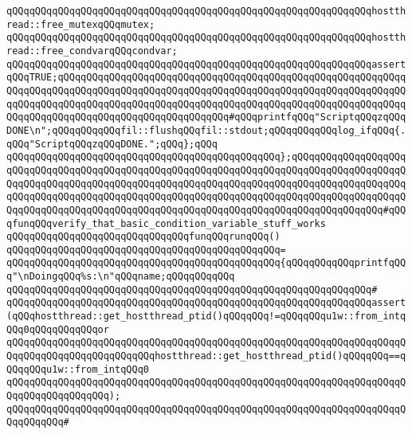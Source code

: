 \newline
\verb|qQQqqQQqqQQqqQQqqQQqqQQqqQQqqQQqqQQqqQQqqQQqqQQqqQQqqQQqqQQqqQQqhostthread::free_mutexqQQqmutex;|\newline
\verb|qQQqqQQqqQQqqQQqqQQqqQQqqQQqqQQqqQQqqQQqqQQqqQQqqQQqqQQqqQQqqQQqhostthread::free_condvarqQQqcondvar;|\newline
\newline
\verb|qQQqqQQqqQQqqQQqqQQqqQQqqQQqqQQqqQQqqQQqqQQqqQQqqQQqqQQqqQQqqQQqassertqQQqTRUE;qQQqqQQqqQQqqQQqqQQqqQQqqQQqqQQqqQQqqQQqqQQqqQQqqQQqqQQqqQQqqQQqqQQqqQQqqQQqqQQqqQQqqQQqqQQqqQQqqQQqqQQqqQQqqQQqqQQqqQQqqQQqqQQqqQQqqQQqqQQqqQQqqQQqqQQqqQQqqQQqqQQqqQQqqQQqqQQqqQQqqQQqqQQqqQQqqQQqqQQqqQQqqQQqqQQqqQQqqQQqqQQqqQQqqQQqqQQqqQQq#qQQqprintfqQQq"ScriptqQQqzqQQqDONE\n";qQQqqQQqqQQqfil::flushqQQqfil::stdout;qQQqqQQqqQQqlog_ifqQQq{.qQQq"ScriptqQQqzqQQqDONE.";qQQq};qQQq|\newline
\newline
\verb|qQQqqQQqqQQqqQQqqQQqqQQqqQQqqQQqqQQqqQQqqQQqqQQq};qQQqqQQqqQQqqQQqqQQqqQQqqQQqqQQqqQQqqQQqqQQqqQQqqQQqqQQqqQQqqQQqqQQqqQQqqQQqqQQqqQQqqQQqqQQqqQQqqQQqqQQqqQQqqQQqqQQqqQQqqQQqqQQqqQQqqQQqqQQqqQQqqQQqqQQqqQQqqQQqqQQqqQQqqQQqqQQqqQQqqQQqqQQqqQQqqQQqqQQqqQQqqQQqqQQqqQQqqQQqqQQqqQQqqQQqqQQqqQQqqQQqqQQqqQQqqQQqqQQqqQQqqQQqqQQqqQQqqQQqqQQqqQQqqQQqqQQq#qQQqfunqQQqverify_that_basic_condition_variable_stuff_works|\newline
\newline
\verb|qQQqqQQqqQQqqQQqqQQqqQQqqQQqqQQqfunqQQqrunqQQq()|\newline
\verb|qQQqqQQqqQQqqQQqqQQqqQQqqQQqqQQqqQQqqQQqqQQqqQQq=|\newline
\verb|qQQqqQQqqQQqqQQqqQQqqQQqqQQqqQQqqQQqqQQqqQQqqQQq{qQQqqQQqqQQqprintfqQQq"\nDoingqQQq%s:\n"qQQqname;qQQqqQQqqQQq|\newline
\verb|qQQqqQQqqQQqqQQqqQQqqQQqqQQqqQQqqQQqqQQqqQQqqQQqqQQqqQQqqQQqqQQq#|\newline
\verb|qQQqqQQqqQQqqQQqqQQqqQQqqQQqqQQqqQQqqQQqqQQqqQQqqQQqqQQqqQQqqQQqassert(qQQqhostthread::get_hostthread_ptid()qQQqqQQq!=qQQqqQQqu1w::from_intqQQq0qQQqqQQqqQQqor|\newline
\verb|qQQqqQQqqQQqqQQqqQQqqQQqqQQqqQQqqQQqqQQqqQQqqQQqqQQqqQQqqQQqqQQqqQQqqQQqqQQqqQQqqQQqqQQqqQQqqQQqhostthread::get_hostthread_ptid()qQQqqQQq==qQQqqQQqu1w::from_intqQQq0|\newline
\verb|qQQqqQQqqQQqqQQqqQQqqQQqqQQqqQQqqQQqqQQqqQQqqQQqqQQqqQQqqQQqqQQqqQQqqQQqqQQqqQQqqQQqqQQq);|\newline
\verb|qQQqqQQqqQQqqQQqqQQqqQQqqQQqqQQqqQQqqQQqqQQqqQQqqQQqqQQqqQQqqQQqqQQqqQQqqQQqqQQq#|\newline
